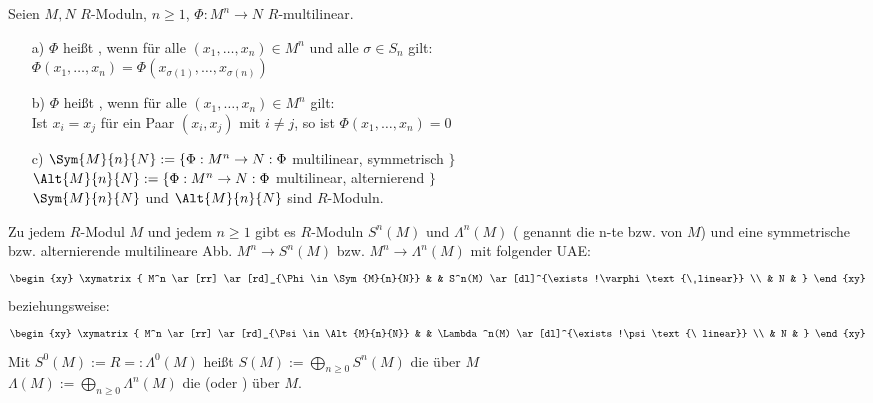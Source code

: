  \begin{Def} Seien $M,N$ $R$-Moduln, $n \geq 1$, $\Phi: M^n \rightarrow N$ $R$-multilinear.
  \begin{enumerate}
   \item[ a) ] $\Phi$ hei\ss t , wenn für alle $(x_1, \dots, x_n ) \in M^n$ und alle $\sigma \in S_n$ gilt:\\
    $\Phi(x_1, \dots , x_n) = \Phi( x_{\sigma(1)},  \dots, x_{\sigma(n)})$
   \item[ b) ] $\Phi$ heißt , wenn für alle $(x_1, \dots, x_n ) \in M^n$ gilt:\\
    Ist $x_i = x_j$ für ein Paar $(x_i,x_j)$ mit $i \neq j$, so ist $\Phi(x_1, \dots , x_n) = 0$
   \item[ c) ] $\Sym{M}{n}{N} := \{ \Phi: M^n \rightarrow N: \Phi$ multilinear, symmetrisch $\}$\\
    $\Alt{M}{n}{N} := \{ \Phi: M^n \rightarrow N: \Phi$ multilinear, alternierend $\}$\\
	 $\Sym{M}{n}{N}$ und  $\Alt{M}{n}{N}$ sind $R$-Moduln.
  \end{enumerate}
 \end{Def}
 \begin{Satz} Zu jedem $R$-Modul $M$ und jedem $n \geq 1$ gibt es $R$-Moduln $S^n(M)$ und $\Lambda^n(M)$ ( genannt die n-te  bzw.  von $M$)
  und eine symmetrische bzw. alternierende multilineare Abb. $M^n \rightarrow S^n(M)$ bzw.  $M^n \rightarrow \Lambda ^n(M)$ mit folgender UAE:
\[
\begin{xy}
  \xymatrix{
      M^n \ar[rr] \ar[rd]_{\Phi\in \Sym{M}{n}{N}}  &     &  S^n(M) \ar[dl]^{\exists!\varphi\text{\ linear}}  \\
                             &  N  &
  }
\end{xy}
\]
beziehungsweise:
\[
\begin{xy}
  \xymatrix{
      M^n \ar[rr] \ar[rd]_{\Psi\in \Alt{M}{n}{N}}  &     &  \Lambda^n(M) \ar[dl]^{\exists!\psi\text{\ linear}}  \\
                             &  N  &
  }
\end{xy}
\]
  Mit $S^0(M) := R =: \Lambda^0(M)$ heißt $S(M):= \bigoplus_{n\geq 0} S^n(M)$ die  über $M$\\
  $\Lambda (M) := \bigoplus_{n\geq 0} \Lambda^n(M)$ die  (oder ) über $M$.
 \end{Satz}
 
